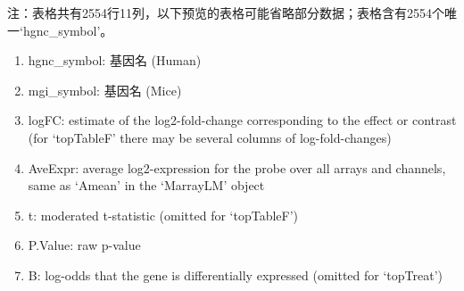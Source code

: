 \documentclass[
]{article}
\providecommand{\tightlist}{%
  \setlength{\itemsep}{0pt}\setlength{\parskip}{0pt}}
\begin{document}
\begin{center}\begin{tcolorbox}[colback=gray!10, colframe=gray!50, width=0.9\linewidth, arc=1mm, boxrule=0.5pt]注：表格共有2554行11列，以下预览的表格可能省略部分数据；表格含有2554个唯一`hgnc\_symbol'。
\end{tcolorbox}
\end{center}
\begin{center}\begin{tcolorbox}[colback=gray!10, colframe=gray!50, width=0.9\linewidth, arc=1mm, boxrule=0.5pt]\begin{enumerate}\tightlist
\item hgnc\_symbol:  基因名 (Human)
\item mgi\_symbol:  基因名 (Mice)
\item logFC:  estimate of the log2-fold-change corresponding to the effect or contrast (for ‘topTableF’ there may be several columns of log-fold-changes)
\item AveExpr:  average log2-expression for the probe over all arrays and channels, same as ‘Amean’ in the ‘MarrayLM’ object
\item t:  moderated t-statistic (omitted for ‘topTableF’)
\item P.Value:  raw p-value
\item B:  log-odds that the gene is differentially expressed (omitted for ‘topTreat’)
\end{enumerate}\end{tcolorbox}
\end{center}
\end{document}
